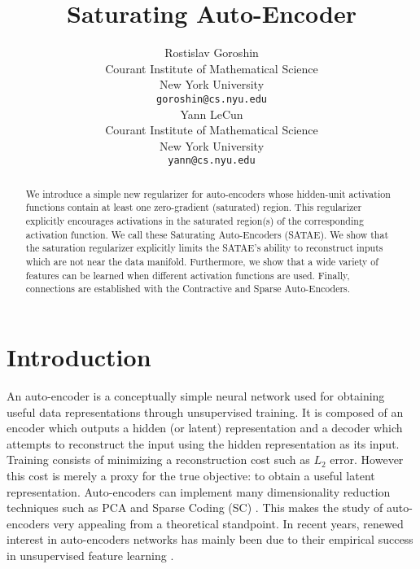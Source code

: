 \documentclass{article} %
\title{Saturating Auto-Encoder}
\author{
Rostislav Goroshin \\
Courant Institute of Mathematical Science\\
New York University \\
\texttt{goroshin@cs.nyu.edu} \\
\And
Yann LeCun \\
Courant Institute of Mathematical Science\\
New York University \\
\texttt{yann@cs.nyu.edu} \\
\date{} }
\begin{document}
\maketitle

\begin{abstract} 
We introduce a simple new regularizer for auto-encoders whose hidden-unit activation functions contain at least one zero-gradient (saturated) region. This regularizer explicitly encourages activations in the saturated region(s) of the corresponding activation function. We call these Saturating Auto-Encoders (SATAE). We show that the saturation regularizer explicitly limits the SATAE's ability to reconstruct inputs which are not near the data manifold. Furthermore, we show that a wide variety of features can be learned when different activation functions are used. Finally, connections are established with the Contractive and Sparse Auto-Encoders.    

\end{abstract} 
\section{Introduction} 
An auto-encoder is a conceptually simple neural network used for obtaining useful data representations through unsupervised training. It is composed of an encoder which outputs a hidden (or latent) representation and a decoder which attempts to reconstruct the input using the hidden representation as its input. Training consists of minimizing a reconstruction cost such as $L_2$ error. However this cost is merely a proxy for the true objective: to obtain a useful latent representation. Auto-encoders can  implement many dimensionality reduction techniques such as PCA and Sparse Coding (SC) \cite{DHS}\cite{SC}\cite{LISTA}. This makes the study of auto-encoders very appealing from a theoretical standpoint. In recent years, renewed interest in auto-encoders networks has mainly been due to their empirical success in unsupervised feature learning \cite{SAE1}\cite{SAE2}\cite{CAE}\cite{DAE}. \\
\end{document}
